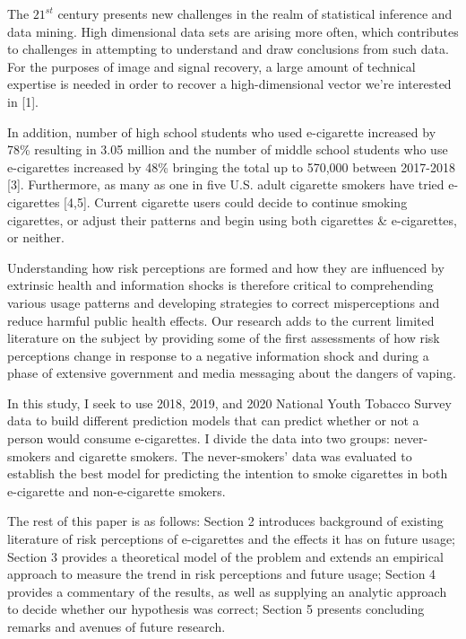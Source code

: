 \documentclass[12pt]{article}
\begin{document}
\hspace{5mm}The $21^{st}$ century presents new challenges in the realm of statistical inference and data mining. High dimensional data sets are arising more often, which contributes to challenges in attempting to understand and draw conclusions from such data. For the purposes of image and signal recovery, a large amount of technical expertise is needed in order to recover a high-dimensional vector we're interested in [1].

In addition, number of high school students who used e-cigarette increased by 78\% resulting in 3.05 million and the number of middle school students who use e-cigarettes increased by 48\% bringing the total up to 570,000 between 2017-2018 [3]. Furthermore, as many as one in five U.S. adult cigarette smokers have tried e-cigarettes [4,5]. Current cigarette users could decide to continue smoking cigarettes, or adjust their patterns and begin using both cigarettes \& e-cigarettes, or neither.

Understanding how risk perceptions are formed and how they are influenced by extrinsic health and information shocks is therefore critical to comprehending various usage patterns and developing strategies to correct misperceptions and reduce harmful public health effects. Our research adds to the current limited literature on the subject by providing some of the first assessments of how risk perceptions change in response to a negative information shock and during a phase of extensive government and media messaging about the dangers of vaping.

In this study, I seek to use 2018, 2019, and 2020 National Youth Tobacco Survey data to build different prediction models that can predict whether or not a person would consume e-cigarettes. I divide the data into two groups: never-smokers and cigarette smokers. The never-smokers' data was evaluated to establish the best model for predicting the intention to smoke cigarettes in both e-cigarette and non-e-cigarette smokers.

The rest of this paper is as follows: Section 2 introduces background of existing literature of risk perceptions of e-cigarettes and the effects it has on future usage; Section 3 provides
a theoretical model of the problem and extends an empirical approach to measure the trend in risk perceptions and future usage; Section 4 provides a commentary of the results, as well as supplying an analytic approach to decide whether our hypothesis was correct; Section 5 presents concluding remarks and avenues of future research.
\end{document}
